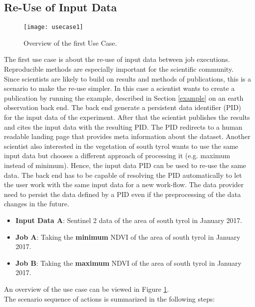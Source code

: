 \documentclass[draft,final]{vutinfth} %
\begin{document}
\subsection{Re-Use of Input Data}\label{UseCase1}
\begin{figure}[h]
	\centering
	\texttt{[image: usecase1]}
	\caption{Overview of the first Use Case.}
	\label{fig:usecase1} %
\end{figure}
The first use case is about the re-use of input data between job executions. Reproducible methods are especially important for the scientific community. Since scientists are likely to build on results and methods of publications, this is a scenario to make the re-use simpler. In this case a scientist wants to create a publication by running the example, described in Section \ref{example} on an earth observation back end. The back end generate a persistent data identifier (PID) for the input data of the experiment. After that the scientist publishes the results and cites the input data with the resulting PID. The PID redirects to a human readable landing page that provides meta information about the dataset. Another scientist also interested in the vegetation of south tyrol wants to use the same input data but chooses a different approach of processing it (e.g. maximum instead of minimum). Hence, the input data PID can be used to re-use the same data. The back end has to be capable of resolving the PID automatically to let the user work with the same input data for a new work-flow. The data provider need to persist the data defined by a PID even if the preprocessing of the data changes in the future.    

\begin{itemize}
	\item \textbf{Input Data A}: Sentinel 2 data of the area of south tyrol in January 2017. 
	\item \textbf{Job A}: Taking the \textbf{minimum} NDVI of the area of south tyrol in January 2017. 
	\item \textbf{Job B}: Taking the \textbf{maximum} NDVI of the area of south tyrol in January 2017.
\end{itemize}

An overview of the use case can be viewed in Figure \ref{fig:usecase1}. \\

The scenario sequence of actions is summarized in the following steps: \\
\end{document}

